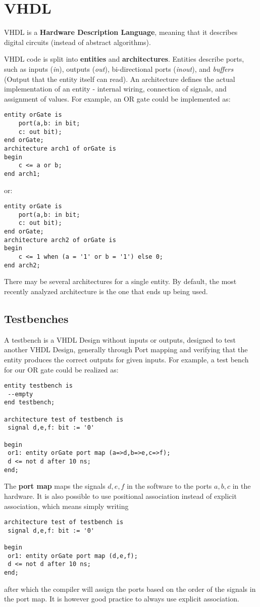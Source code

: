 \documentclass{report}
\newcommand{\tbf}{\textbf}
\newcommand*{\newpar}{\par\vspace{\baselineskip}\noindent} %
\begin{document}
\section{VHDL}
VHDL is a \tbf{Hardware Description Language}, meaning that it describes digital circuits (instead of abstract algorithms).
\newpar
VHDL code is split into \tbf{entities} and \tbf{architectures}. Entities describe ports, such as inputs (\textit{in}), outputs (\textit{out}), bi-directional ports (\textit{inout}), and \textit{buffers} (Output that the entity itself can read). An architecture defines the actual implementation of an entity - internal wiring, connection of signals, and assignment of values. For example, an OR gate could be implemented as:
\begin{verbatim}
entity orGate is
    port(a,b: in bit;
    c: out bit);
end orGate;
architecture arch1 of orGate is
begin
    c <= a or b;
end arch1;
\end{verbatim}
or:
\begin{verbatim}
entity orGate is
    port(a,b: in bit;
    c: out bit);
end orGate;
architecture arch2 of orGate is
begin
    c <= 1 when (a = '1' or b = '1') else 0;
end arch2;
\end{verbatim}
\newpar
There may be several architectures for a single entity. By default, the most recently analyzed architecture is the one that ends up being used.
\subsection{Testbenches}
A testbench is a VHDL Design without inputs or outputs, designed to test another VHDL Design, generally through Port mapping and verifying that the entity produces the correct outputs for given inputs. For example, a test bench for our OR gate could be realized as:
\begin{verbatim}
entity testbench is
 --empty
end testbench;

architecture test of testbench is
 signal d,e,f: bit := '0'

begin
 or1: entity orGate port map (a=>d,b=>e,c=>f);
 d <= not d after 10 ns;
end;
\end{verbatim}
The \tbf{port map} maps the signals $d,e,f$ in the software to the ports $a,b,c$ in the hardware. It is also possible to use positional association instead of explicit association, which means simply writing
\begin{verbatim}
architecture test of testbench is
 signal d,e,f: bit := '0'

begin
 or1: entity orGate port map (d,e,f);
 d <= not d after 10 ns;
end;
\end{verbatim}
after which the compiler will assign the ports based on the order of the signals in the port map. It is however good practice to always use explicit association.
\end{document}
